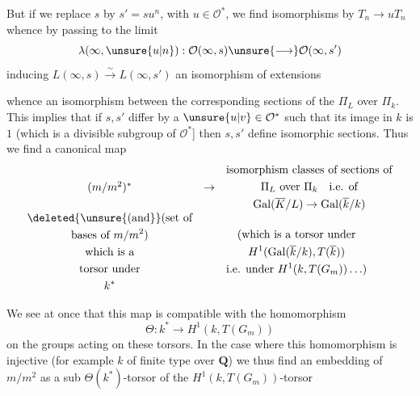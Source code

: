 But if we replace $s$ by $s'=su^n$, with $u\in\mathcal{O}^*$, we find isomorphisms
by $T_n\to uT_n$
whence by passing to the limit
\[
\lambda(\infty,\unsure{u|n}):\mathcal{O}(\infty,s)\unsure{\longrightarrow}\mathcal{O}(\infty,s')
\]
inducing $L(\infty,s)\xrightarrow{\sim}L(\infty,s')$ an isomorphism of extensions 



whence an isomorphism between the corresponding sections of the $\Pi_{L}$ over $\Pi_k$.
This implies that if $s,s'$ differ by a $\unsure{u|v}\in\mathcal{O}^*$ such that its image in $k$ is $1$   (which is a divisible subgroup of $\mathcal{O}^*$] then $s,s'$ define isomorphic sections.
Thus we find a canonical map
\[
\begin{array}{ccl}
(m/m^2)^* & \to &
\begin{gathered}
\text{isomorphism classes of sections of}\\
\Pi_L\text{ over }\Pi_k\quad\text{i.e. of}\\
\operatorname{Gal}(\overline{K}/L)\to\operatorname{Gal}(\overline{k}/k)
\end{gathered}
\\[1ex]
\begin{gathered}
\deleted{\unsure{\text{(and}}}\text{(set of}\\
\text{bases of }m/m^2\text{)}\\
\text{which is a}\\
\text{torsor under}\\ k^*
\end{gathered}
&&
\begin{gathered}
\text{(which is a torsor under}\\
H^1(\operatorname{Gal}(\overline{k}/k),T(\overline{k}))\\
\text{i.e. under }H^1(k,T(G_m))\ldots)
\end{gathered}
\end{array}
\]

We see at once that this map is compatible with the homomorphism
\[
\Theta:k^*\to H^1(k,T(G_m))
\]
on the groups acting on these torsors.
In the case where this homomorphism is injective (for example $k$  of finite type over $\mathbf{Q}$) we thus find an embedding of $m/m^2$ as a sub $\Theta(k^*)$-torsor of the $H^1(k,T(G_m))$-torsor

